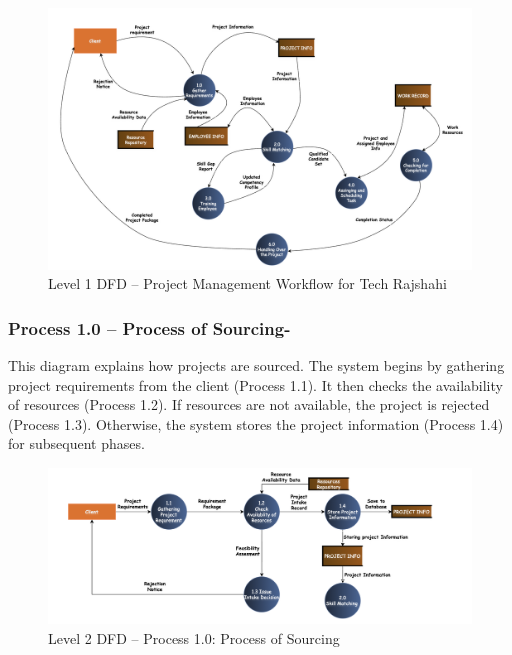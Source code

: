 \documentclass[12pt,a4paper]{article}
\begin{document}
\begin{figure}[H]
    \centering
    \includegraphics[width=\textwidth]{Fig/level1_dfd.png}
    \caption{Level 1 DFD – Project Management Workflow for Tech Rajshahi}
    \label{fig:level1_dfd}
\end{figure}

\vspace{1.5em}
\subsubsection*{Process 1.0 – Process of Sourcing-}
\noindent
This diagram explains how projects are sourced. The system begins by gathering project requirements from the client (Process 1.1). It then checks the availability of resources (Process 1.2). If resources are not available, the project is rejected (Process 1.3). Otherwise, the system stores the project information (Process 1.4) for subsequent phases.

\begin{figure}[H]
    \centering
    \includegraphics[width=\textwidth]{Fig/process1_dfd.png}
    \caption{Level 2 DFD – Process 1.0: Process of Sourcing}
    \label{fig:level2_process1}
\end{figure}

\newpage
\end{document}
